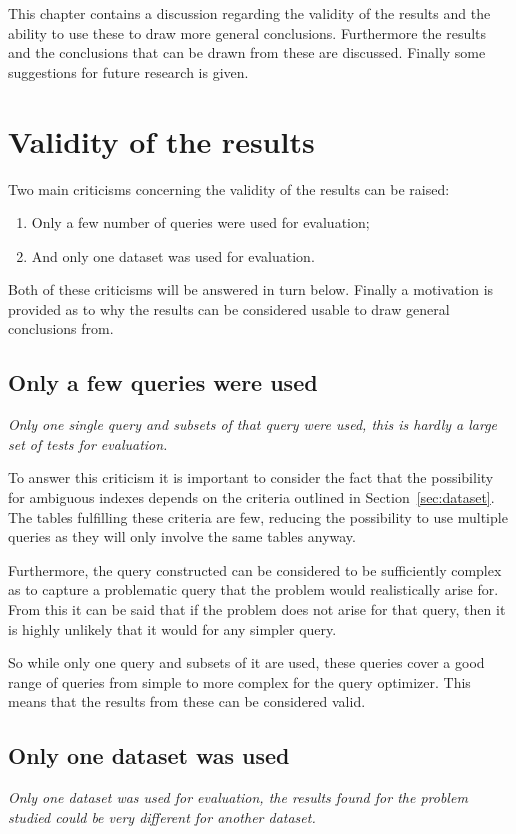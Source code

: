 This chapter contains a discussion regarding the validity of the results and the
ability to use these to draw more general conclusions. Furthermore the results
and the conclusions that can be drawn from these are discussed. Finally some
suggestions for future research is given.

\section{Validity of the results}\label{sec:validity}
Two main criticisms concerning the validity of the results can be raised:
\begin{enumerate}
\item Only a few number of queries were used for evaluation;
\item And only one dataset was used for evaluation.
\end{enumerate}

Both of these criticisms will be answered in turn below. Finally a motivation
is provided as to why the results can be considered usable to draw general conclusions from.

\subsection{Only a few queries were used}
\textit{Only one single query and subsets of that query were used, this is hardly a
large set of tests for evaluation.}

To answer this criticism it is important to consider the fact that the
possibility for ambiguous indexes depends on the criteria outlined in
Section~\ref{sec:dataset}. The tables fulfilling these criteria are few, reducing
the possibility to use multiple queries as they will only involve the same
tables anyway.

Furthermore, the query constructed can be considered to be sufficiently complex
as to capture a problematic query that the problem would realistically arise
for. From this it can be said that if the problem does not arise for that query,
then it is highly unlikely that it would for any simpler query.

So while only one query and subsets of it are used, these queries cover a good
range of queries from simple to more complex for the query optimizer. This means
that the results from these can be considered valid.

\subsection{Only one dataset was used}
\textit{Only one dataset was used for evaluation, the results found for the
  problem studied could be very different for another dataset.}

